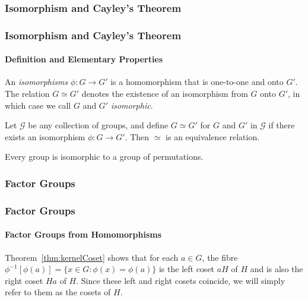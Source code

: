 {\subsubsection{Isomorphism and Cayley's Theorem}}
{\subsubsection{Isomorphism and Cayley's Theorem\protect\footnotemark}
}
\paragraph{Definition and Elementary Properties}
\begin{definition}[Isomorphism]
An \emph{isomorphisms} $\phi:G\to G'$ is a homomorphism that is
one-to-one and onto $G'$.  The relation $G \simeq G'$ denotes the
existence of an isomorphism from $G$ onto $G'$, in which case we call
$G$ and $G'$ \emph{isomorphic}.
\end{definition}

\begin{theorem}
Let $\mathcal{G}$ 
be any collection of groups, and define $G\simeq G'$ for $G$ and $G'$
in $\mathcal{G}$ if there exists an isomorphism $\phi:G\to
G'$.  Then $\simeq$ is an equivalence relation.
\end{theorem}
\begin{theorem}
Every group is isomorphic to a group of permutations.
\end{theorem}

{\subsubsection{Factor Groups}}
{\subsubsection{Factor Groups\protect\footnotemark}
}
\paragraph{Factor Groups from Homomorphisms}
Theorem~\ref{thm:kernelCoset} shows that for each $a\in G$, the fibre
$\phi^{-1}[\phi(a)] = \{x \in G : \phi(x) = \phi(a)\}$ is the left
coset $aH$ of $H$ and is also the right coset $Ha$ of $H$.  Since
these left and right cosets coincide, we will simply refer to them as
the cosets of $H$.

